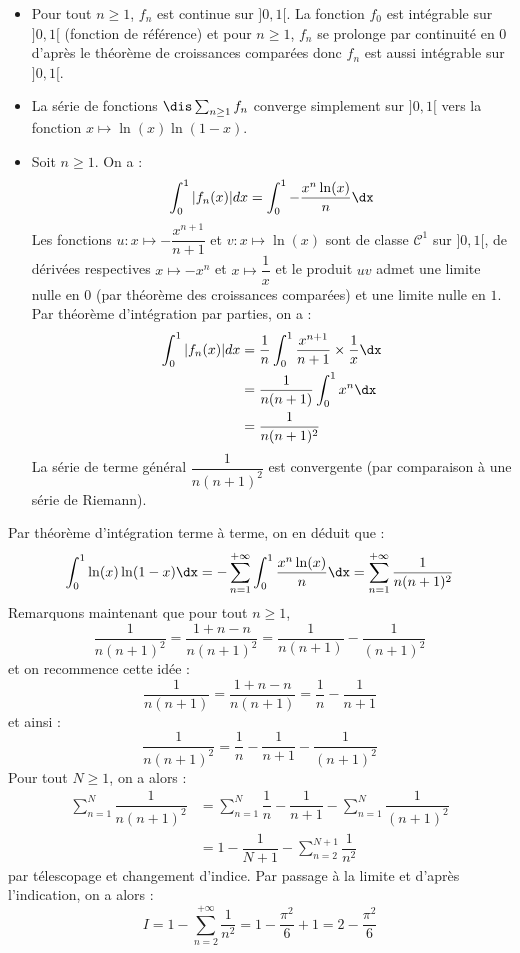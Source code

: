 \documentclass[a4paper,10pt]{report}
\begin{document}
\begin{corr}
\begin{enumerate}
\begin{itemize}
\item Pour tout $n \geq 1$, $f_n$ est continue sur $]0,1[$. La fonction $f_0$ est intégrable sur $]0,1[$ (fonction de référence) et pour $n \geq 1$, $f_n$ se prolonge par continuité en $0$ d'après le théorème de croissances comparées donc $f_n$ est aussi intégrable sur $]0,1[$.
\item La série de fonctions $\dis \sum_{n \geq 1} f_n$ converge simplement sur $]0,1[$ vers la fonction $x \mapsto \ln(x) \ln(1-x)$.
\item Soit $n \geq 1$. On a :
$$\int_{0}^1 \vert f_n(x) \vert dx  = \int_{0}^1  - \dfrac{x^n \ln(x)}{n} \dx$$
Les fonctions $u: x \mapsto -\dfrac{x^{n+1}}{n+1}$ et $v: x \mapsto \ln(x)$ sont de classe $\mathcal{C}^1$ sur $]0,1[$, de dérivées respectives $x \mapsto -x^n$ et $x \mapsto \dfrac{1}{x}$ et le produit $uv$ admet une limite nulle en $0$ (par théorème des croissances comparées) et une limite nulle en $1$. Par théorème d'intégration par parties, on a :
\begin{align*}
\int_{0}^1 \vert f_n(x) \vert dx & = \dfrac{1}{n}\int_{0}^1 \dfrac{x^{n+1}}{n+1} \times \dfrac{1}{x} \dx \\
& = \dfrac{1}{n(n+1)} \int_{0}^1 x^n \dx \\
& = \dfrac{1}{n(n+1)^2} 
\end{align*}
La série de terme général $\dfrac{1}{n(n+1)^2}$ est convergente (par comparaison à une série de Riemann).
\end{itemize}
Par théorème d'intégration terme à terme, on en déduit que :
$$ \int_{0}^1 \ln(x)\ln(1-x) \dx = - \sum_{n=1}^{+ \infty} \int_{0}^1 \dfrac{x^n\ln(x)}{n} \dx = \sum_{n=1}^{+\infty} \dfrac{1}{n(n+1)^2}$$
Remarquons maintenant que pour tout $n \geq 1$,
$$ \dfrac{1}{n(n+1)^2} = \dfrac{1+n - n}{n(n+1)^2} = \dfrac{1}{n(n+1)}- \dfrac{1}{(n+1)^2}$$
et on recommence cette idée :
$$ \dfrac{1}{n(n+1)} = \dfrac{1+n-n}{n(n+1)} = \dfrac{1}{n}- \dfrac{1}{n+1}$$
et ainsi :
$$ \dfrac{1}{n(n+1)^2} = \dfrac{1}{n}- \dfrac{1}{n+1} - \dfrac{1}{(n+1)^2}$$
Pour tout $N \geq 1$, on a alors :
\begin{align*}
\sum_{n=1}^{N} \dfrac{1}{n(n+1)^2} & = \sum_{n=1}^{N}\dfrac{1}{n}- \dfrac{1}{n+1} -  \sum_{n=1}^{N} \dfrac{1}{(n+1)^2} \\
& = 1 - \dfrac{1}{N+1} - \sum_{n=2}^{N+1} \dfrac{1}{n^2} 
\end{align*}
par télescopage et changement d'indice. Par passage à la limite et d'après l'indication, on a alors :
$$ I = 1 - \sum_{n=2}^{+ \infty} \dfrac{1}{n^2} = 1 - \dfrac{\pi^2}{6} +1 = 2 - \dfrac{\pi^2}{6}$$

\end{enumerate}
\end{corr}
\end{document}

